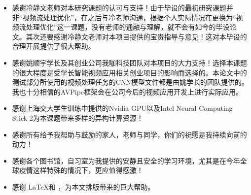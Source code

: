 

\begin{acknowledgements}
\begin{itemize}

\item 感谢冷静文老师对本研究课题的认可与支持！由于毕设的最初研究课题并非“视频流处理优化”，在之后与冷老师沟通，根据个人实际情况在更换为“视频流处理优化”这一课题，没有老师的通融与理解，就不会有如今的毕设论文。其次还要感谢冷静文老师对本项目提供的宝贵指导与意见！这对本毕设的合理开展提供了很大帮助。
  
\item 感谢姚顺宇学长及其创业公司我咖科技团队对本项目的大力支持！选择本课题的很大程度是受学长智能视频应用相关创业项目的影响而选择的。本论文中的测试部分所使用的视频处理任务的CNN模型文件都是由姚学长的团队提供的。我也十分相信的AVPipe框架会在公司今后的视频应用开发上进行实际应用。
  
\item 感谢上海交大学生训练中提供的Nvidia GPU以及Intel Neural Computing Stick 2为本课题带来多样的异构计算资源！
  
\item 感谢所有给予我帮助与鼓励的家人，老师与同学，你们的祝愿是我持续向前的动力！
  
\item 感谢各个图书馆，自习室为我提供的安静且安全的学习环境，尤其是在今年全球疫情这样特殊的情况下，更应值得感激！

\item 感谢 \LaTeX 和 \href{https://github.com/sjtug/SJTUThesis}{\sjtuthesis}，为本文排版带来的巨大帮助。

\end{itemize}
\end{acknowledgements}

